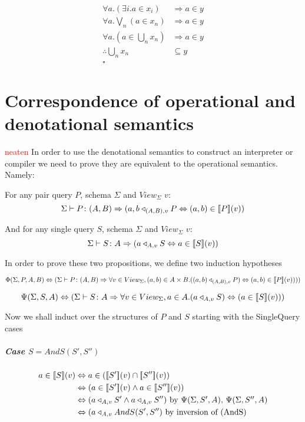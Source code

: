 \documentclass[12pt,a4paper,twoside,openright]{report}
\newcommand\todo[1]{\textcolor{red}{#1}}
\newcommand{\db}[1]{{\bf [\![}#1{\bf ]\!]}}
\newcommand{\deno}[1]{\db{#1}(v)}
\newcommand{\typeRule}[2]{\Sigma\vdash #1 \colon #2}
\newcommand{\denoRule}[2]{#1 \in \deno{#2}}
\newcommand{\opRule}[3]{#1 \triangleleft_{#2, v} #3}
\newcommand{\phiRule}[3]{\Phi(\Sigma, #1, #2, #3)}
\newcommand{\psiRule}[2]{\Psi(\Sigma, #1, #2)}
\begin{document}
{{\begin{minipage}{\dimexpr\textwidth-1cm}
\begin{equation}
\label{LeastUpperBound}
\begin{split}
\forall a. (\exists i. a \in x_i) & \Rightarrow a \in y \\
\forall a. \bigvee_n (a \in x_n) & \Rightarrow a \in y \\
\forall a. (a \in \bigcup_n x_n) & \Rightarrow a \in y \\
\therefore \bigcup_n x_n & \subseteq y\\
\square
\end{split}
\end{equation}

\xdef\tpd{0pt}
\end{minipage}

\prevdepth\tpd


\chapter{Correspondence of operational and denotational semantics}
\todo{neaten}
In order to use the denotational semantics to construct an interpreter or compiler we need to prove they are equivalent to the operational semantics. Namely:

For any pair query $P$, schema $\Sigma$ and $View_{\Sigma}$ $v$:
$$
\typeRule{P}{(A, B)}\Rightarrow \opRule{(a, b}{(A, B)}{P} \Leftrightarrow \denoRule{(a, b)}{P})
$$

And for any single query $S$, schema $\Sigma$ and $View_{\Sigma}$ $v$: 
$$
\typeRule{S}{A}\Rightarrow \opRule{(a}{A}{S} \Leftrightarrow \denoRule{a}{S})
$$

In order to prove these two propositions, we define two induction hypotheses



$$
\phiRule{P}{A}{B} \Leftrightarrow (\typeRule{P}{(A, B)} \Rightarrow \forall v \in View_{\Sigma}, (a, b) \in A \times B. (\opRule{(a, b)}{(A, B)}{P}) \Leftrightarrow \denoRule{(a, b)}{P})))
$$

$$
\psiRule{S}{A} \Leftrightarrow (\typeRule{S}{A} \Rightarrow \forall v \in View_{\Sigma}, a \in A. (\opRule{a}{A}{S}) \Leftrightarrow (\denoRule{a}{S}))
$$

Now we shall induct over the structures of $P$ and $S$ starting with the SingleQuery cases


\paragraph{Case $S = AndS(S', S'')$}
\begin{equation} \label{case AndS}
\begin{split}
\denoRule{a}{S} & \Leftrightarrow a \in (\deno{S'} \cap \deno{S''}) \\
				& \Leftrightarrow (\denoRule{a}{S'} \wedge \denoRule{a}{S''}) \\
				& \Leftrightarrow (\opRule{a}{A}{S'} \wedge \opRule{a}{A}{S''}) \mbox{ by $\psiRule{S'}{A}$, $\psiRule{S''}{A}$}\\
				& \Leftrightarrow (\opRule{a}{A}{AndS(S', S'')} \mbox{ by inversion of (AndS)}
\end{split}
\end{equation}

}}
\end{document}
